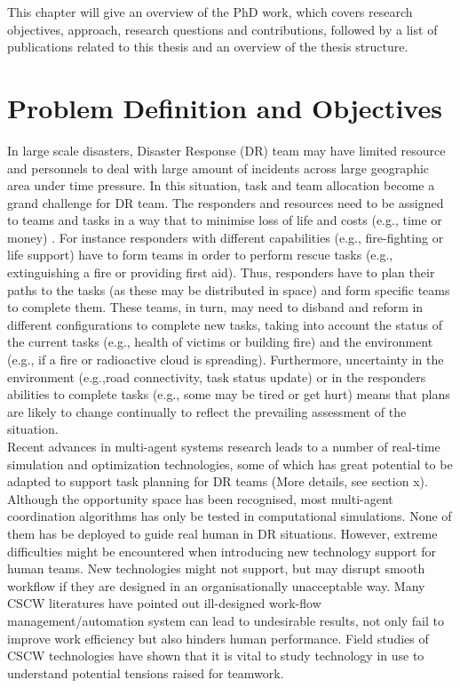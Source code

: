 This chapter will give an overview of the PhD work, which covers research objectives, approach, research questions and contributions, followed by a list of publications related to this thesis and an overview of the thesis structure.\\


\section{Problem Definition and Objectives}
In large scale disasters, Disaster Response (DR) team may have limited resource and personnels to deal with large amount of incidents across large geographic area under time pressure. In this situation, task and team allocation become a grand challenge for DR team. The responders and resources need to be assigned to teams and tasks in a way that to minimise loss of life and costs (e.g., time or money) . For instance responders with different capabilities (e.g., fire-fighting or life support) have to form teams in order to perform rescue tasks (e.g., extinguishing a fire or providing first aid). Thus, responders have to plan their paths to the tasks (as these may be distributed in space) and form specific teams to complete them. These teams, in turn, may need to disband and reform in different configurations to complete new tasks, taking into account the status of the current tasks (e.g., health of victims or building fire) and the environment (e.g., if a fire or radioactive cloud is spreading). Furthermore, uncertainty in the environment (e.g.,road connectivity, task status update) or in the responders abilities to complete tasks (e.g., some may be tired or get hurt) means that plans are likely to change continually to reflect the prevailing assessment of the situation.\\

Recent advances in multi-agent systems research leads to a number of real-time simulation and optimization technologies, some of which has great potential to be adapted to support task planning for DR teams (More details, see section x). Although the opportunity space has been recognised, most multi-agent coordination algorithms has only be tested in computational simulations. None of them has be deployed to guide real human in DR situations. However, extreme difficulties might be encountered when introducing new technology support for human teams. New technologies might not support, but may disrupt smooth workflow if they are designed in an organisationally unacceptable way. Many CSCW literatures have pointed out ill-designed work-flow management/automation system can lead to undesirable results, not only fail to improve work efficiency but also hinders human performance. Field studies of CSCW technologies have shown that it is vital to study technology in use to understand potential tensions raised for teamwork.  \\

